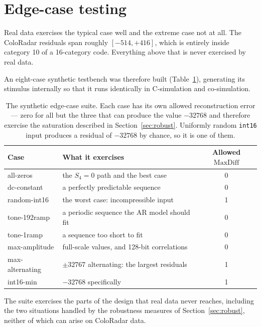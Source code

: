 \section{Edge-case testing}
\label{sec:edgecases}

Real data exercises the typical case well and the extreme case not at all. The
ColoRadar residuals span roughly $[-514, +416]$, which is entirely inside
category 10 of a 16-category code. Everything above that is never exercised by real data.

An eight-case synthetic testbench was therefore built
(Table~\ref{tab:edgecases}), generating its stimulus internally so that it runs
identically in C-simulation and co-simulation.

\begin{table}[t]
\centering
\caption[Synthetic edge cases]{The synthetic edge-case suite. Each case has its
own allowed reconstruction error --- zero for all but the three that can
produce the value $-32768$ and therefore exercise the saturation described in
Section~\ref{sec:robust}. Uniformly random \texttt{int16} input produces a
residual of $-32768$ by chance, so it is one of them.}
\label{tab:edgecases}
\small
\begin{tabular}{@{}llc@{}}
\toprule
Case & What it exercises & Allowed $\mathrm{MaxDiff}$ \\
\midrule
all-zeros        & the $S_4 = 0$ path and the best case & 0 \\
dc-constant      & a perfectly predictable sequence & 0 \\
random-int16     & the worst case: incompressible input & 1 \\
tone-192ramp     & a periodic sequence the AR model should fit & 0 \\
tone-1ramp       & a sequence too short to fit & 0 \\
max-amplitude    & full-scale values, and 128-bit correlations & 0 \\
max-alternating  & $\pm 32767$ alternating: the largest residuals & 1 \\
int16-min        & $-32768$ specifically & 1 \\
\bottomrule
\end{tabular}
\end{table}

The suite exercises the parts of the design that real data never reaches,
including the two situations handled by the robustness measures of
Section~\ref{sec:robust}, neither of which can arise on ColoRadar data.

